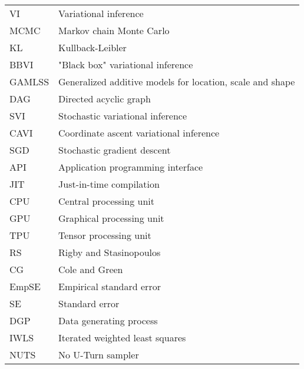 \begin{tabular}{@{} l @{\hskip 1in} l}
  VI & Variational inference \\
  MCMC & Markov chain Monte Carlo \\
  KL & Kullback-Leibler \\
  BBVI & "Black box" variational inference \\
  GAMLSS & Generalized additive models for location, scale and shape \\
  DAG & Directed acyclic graph \\ 
  SVI & Stochastic variational inference \\
  CAVI & Coordinate ascent variational inference \\
  SGD & Stochastic gradient descent \\
  API & Application programming interface \\
  JIT & Just-in-time compilation \\
  CPU & Central processing unit \\
  GPU & Graphical processing unit \\
  TPU & Tensor processing unit \\
  RS & Rigby and Stasinopoulos \\
  CG & Cole and Green \\
  EmpSE & Empirical standard error \\
  SE & Standard error \\
  DGP & Data generating process \\
  IWLS & Iterated weighted least squares \\
  NUTS & No U-Turn sampler \\
\end{tabular}
